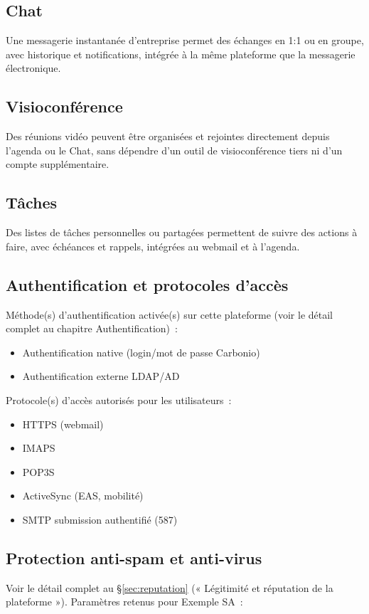 \documentclass[11pt,a4paper]{report}
\begin{document}
\subsection{Chat}
Une messagerie instantanée d'entreprise permet des échanges en 1:1 ou en groupe, avec historique et notifications, intégrée à la même plateforme que la messagerie électronique.\allowbreak{}

\subsection{Visioconférence}
Des réunions vidéo peuvent être organisées et rejointes directement depuis l'agenda ou le Chat, sans dépendre d'un outil de visioconférence tiers ni d'un compte supplémentaire.\allowbreak{}

\subsection{Tâches}
Des listes de tâches personnelles ou partagées permettent de suivre des actions à faire, avec échéances et rappels, intégrées au webmail et à l'agenda.\allowbreak{}


\subsection{Authentification et protocoles d'accès}
Méthode(s) d'authentification activée(s) sur cette plateforme (voir le détail complet au chapitre Authentification)~:
\begin{itemize}[nosep]
  \item Authentification native (login/mot de passe Carbonio)
  \item Authentification externe LDAP/AD
\end{itemize}

Protocole(s) d'accès autorisés pour les utilisateurs~:
\begin{itemize}[nosep]
  \item HTTPS (webmail)
  \item IMAPS
  \item POP3S
  \item ActiveSync (EAS, mobilité)
  \item SMTP submission authentifié (587)
\end{itemize}

\subsection{Protection anti-spam et anti-virus}
Voir le détail complet au \S\ref{sec:reputation} (« Légitimité et réputation de la plateforme »). Paramètres retenus pour Exemple SA~:
\end{document}
